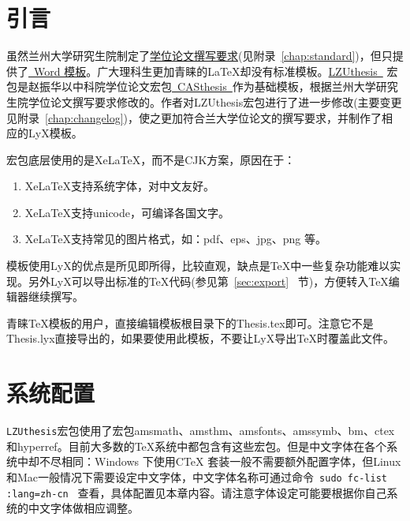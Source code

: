 \documentclass[twoside,longtitle]{LZUthesis}
\begin{document}
\tableofcontents{}


\mainmatter

\pagestyle{lzu}


\chapter{引言\label{chap:intro}}

虽然兰州大学研究生院制定了\href{http://ge.lzu.edu.cn/degree/xwsq/lwgf/201103/1186.htm}{学位论文撰写要求}(见附录~\ref{chap:standard})，但只提供了\href{http://ge.lzu.edu.cn/degree/xwsq/lwgf/201103/1187.htm}{~Word 模板}。广大理科生更加青睐的\LaTeX{}却没有标准模板。\href{http://blog.sciencenet.cn/home.php?mod=space&uid=117412&do=blog&id=512804}{LZUthesis~} 宏包是赵振华以中科院学位论文宏包\href{http://www.ctex.org/PackageCASthesis}{~CASthesis~}作为基础模板，根据兰州大学研究生院学位论文撰写要求修改的。作者对LZUthesis宏包进行了进一步修改(主要变更见附录~\ref{chap:changelog})，使之更加符合兰大学位论文的撰写要求，并制作了相应的LyX模板。

宏包底层使用的是Xe\LaTeX{}，而不是CJK方案，原因在于：
\begin{enumerate}
\item Xe\LaTeX{}支持系统字体，对中文友好。
\item Xe\LaTeX{}支持unicode，可编译各国文字。
\item Xe\LaTeX{}支持常见的图片格式，如：pdf、eps、jpg、png 等。
\end{enumerate}


模板使用LyX的优点是所见即所得，比较直观，缺点是\TeX{}中一些复杂功能难以实现。另外LyX可以导出标准的\TeX{}代码(参见第~\ref{sec:export}~ 节)，方便转入\TeX{}编辑器继续撰写。

青睐\TeX{}模板的用户，直接编辑模板根目录下的Thesis.tex即可。注意它不是Thesis.lyx直接导出的，如果要使用此模板，不要让LyX导出\TeX{}时覆盖此文件。


\chapter{系统配置}

\texttt{LZUthesis}宏包使用了宏包amsmath、amsthm、amsfonts、amssymb、bm、ctex 和hyperref。目前大多数的\TeX{}系统中都包含有这些宏包。但是中文字体在各个系统中却不尽相同：Windows 下使用C\TeX{} 套装一般不需要额外配置字体，但Linux 和Mac一般情况下需要设定中文字体，中文字体名称可通过命令~\lstinline!sudo fc-list :lang=zh-cn!~ 查看，具体配置见本章内容。请注意字体设定可能要根据你自己系统的中文字体做相应调整。
\end{document}
